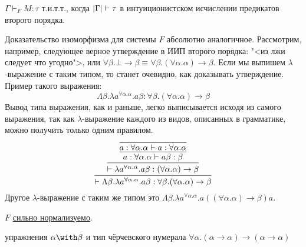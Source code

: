 \begin{theorem}
    $\Gamma \vdash_F M :\tau$ т.и.т.т., когда $\left|\Gamma\right| \vdash \tau$ в интуиционистском исчислении предикатов второго порядка.
\end{theorem}

Доказательство изоморфизма для системы $F$ абсолютно аналогичное.
Рассмотрим, например, следующее верное утверждение в ИИП второго порядка: "<из лжи следует что угодно">, или
$\forall \beta . \bot \rightarrow \beta \equiv \forall \beta . (\forall \alpha.\alpha) \rightarrow \beta$.
Если мы выпишем $\lambda$-выражение с таким типом, то станет очевидно, как доказывать утверждение. Пример такого выражения:
\[
    \Lambda \beta . \lambda a^{\forall \alpha.\alpha} . a \beta :
    \forall \beta . (\forall \alpha.\alpha) \rightarrow \beta
\]
Вывод типа выражения, как и раньше, легко выписывается исходя из самого выражения,
так как $\lambda$-выражение каждого из видов, описанных в грамматике, можно получить только одним правилом.
\[
    \infer{\vdash \Lambda \beta . \lambda a^{\forall \alpha.\alpha} . a \beta : \forall \beta . (\forall \alpha.\alpha) \rightarrow \beta}
    {   \infer{\vdash \lambda a^{\forall \alpha.\alpha} . a \beta : (\forall \alpha.\alpha) \rightarrow \beta}
        {   \infer{a : \forall \alpha . \alpha \vdash a \beta : \beta}
            {   \infer{a : \forall \alpha.\alpha \vdash a : \forall \alpha.\alpha}{}
            }
        }
    }
\]
Другое $\lambda$-выражение с таким же типом это
$\Lambda \beta . \lambda a^{\forall \alpha . \alpha} . a ((\forall \alpha.\alpha) \rightarrow \beta) a$.

\begin{theorem}
    $F$ \hyperref[strong-normalization]{сильно нормализуемо}.
\end{theorem}

\todo упражнения $\alpha\with\beta$ и тип чёрчевского нумерала
$\forall\alpha.(\alpha\rightarrow\alpha)\rightarrow(\alpha\rightarrow\alpha)$
